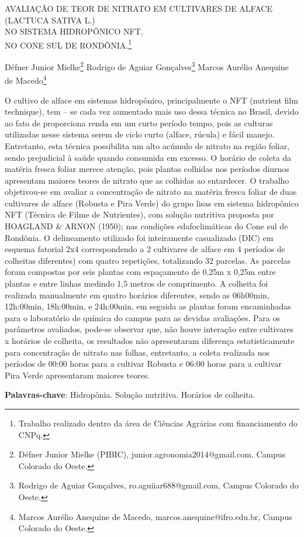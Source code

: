 \documentclass[article,12pt,onesidea,4paper,english,brazil]{abntex2}
\begin{document}
	
	
	\frenchspacing 
	
	\begin{center}
		\LARGE AVALIAÇÃO DE TEOR DE NITRATO EM CULTIVARES DE ALFACE \MakeUppercase{(Lactuca sativa L.)}\\NO SISTEMA HIDROPÔNICO NFT,\\NO CONE SUL DE RONDÔNIA.\footnote{Trabalho realizado dentro da área de Ciências Agrárias com financiamento do CNPq.}
		
		\normalsize
	Défner Junior Mielke\footnote{Défner Junior Mielke (PIBIC), junior.agronomia2014@gmail.com, Campus Colorado do Oeste.} 
		Rodrigo de Aguiar Gonçalves\footnote{Rodrigo de Aguiar Gonçalves, ro.aguiiar688@gmail.com, Campus Colorado do Oeste.} 
		Marcos Aurélio Anequine de Macedo\footnote{Marcos Aurélio Anequine de Macedo, marcos.anequine@ifro.edu.br, Campus Colorado do Oeste.} 
	\end{center}
	
	\noindent O cultivo de alface em sistemas hidropônico, principalmente o NFT (nutrient film technique), tem – se cada vez aumentado mais uso dessa técnica no Brasil, devido ao fato de proporciona renda em um curto período tempo, pois as culturas utilizadas nesse sistema serem de ciclo curto (alface, rúcula) e fácil manejo. Entretanto, esta técnica possibilita um alto acúmulo de nitrato na região foliar, sendo prejudicial à saúde quando consumida em excesso. O horário de coleta da matéria fresca foliar merece atenção, pois plantas colhidas nos períodos diurnos apresentam maiores teores de nitrato que as colhidas ao entardecer. O trabalho objetivou-se em avaliar a concentração de nitrato na matéria fresca foliar de duas cultivares de alface (Robusta e Pira Verde) do grupo lisas em sistema hidropônico NFT (Técnica de Filme de Nutrientes), com solução nutritiva proposta por HOAGLAND \& ARNON (1950); nas condições edafoclimáticas do Cone sul de Rondônia. O delineamento utilizado foi inteiramente casualizado (DIC) em esquema fatorial 2x4 correspondendo a 2 cultivares de alface em 4 períodos de colheitas diferentes) com quatro repetições, totalizando 32 parcelas. As parcelas foram compostas por seis plantas com espaçamento de 0,25m x 0,25m entre plantas e entre linhas medindo 1,5 metros de comprimento. A colheita foi realizada manualmente em quatro horários diferentes, sendo as 06h00min, 12h:00min, 18h:00min, e 24h:00min, em seguida as plantas foram encaminhadas para o laboratório de química do campus para as devidas avaliações. Para os parâmetros avaliados, pode-se observar que, não houve interação entre cultivares x horários de colheita, os resultados não apresentaram diferença estatisticamente para concentração de nitrato nas folhas, entretanto, a coleta realizada nos períodos de 00:00 horas para a cultivar Robusta e 06:00 horas para a cultivar Pira Verde apresentaram maiores teores.
	
	\vspace{\onelineskip}
	
	\noindent
	\textbf{Palavras-chave}: Hidropônia. Solução nutritiva. Horários de colheita.
	
\end{document}
